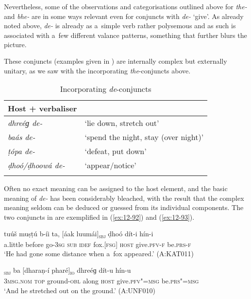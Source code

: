 Nevertheless, some of the observations and categorisations outlined above for \textit{the-} and \textit{bhe-} are in some ways relevant even for conjuncts with \textit{de-} `give'. As already noted above, \textit{de-} is already as a~simple verb rather polysemous and as such is associated with a~few different valance patterns, something that further blurs the picture.


 These conjuncts (examples given in ) are internally complex but externally unitary, as we saw with the incorporating \textit{the}-conjuncts above. 


\begin{table}[ht]
\caption{Incorporating \textit{de}-conjuncts}
\begin{tabularx}{.75\textwidth}{ l@{\hspace{45pt}} Q }
\lsptoprule
Host + verbaliser &
\\\hline
\textit{dhreéɡ de-} &
`lie down, stretch out'\\
\textit{baás de-} &
`spend the night, stay (over night)'\\
\textit{ṭópa de-} &
`defeat, put down'\\
\textit{ḍhoó/ḍhoowá de-} &
`appear/notice'\\\lspbottomrule
\end{tabularx}
\label{tab:12-7}
\end{table}


Often no exact meaning can be assigned to the host element, and the basic meaning of \textit{de-} has been considerably bleached, with the result that the complex meaning seldom can be deduced or guessed from its individual components. The two conjuncts in  are exemplified in (\ref{ex:12-92}) and (\ref{ex:12-93}).

\begin{exe}
\ex
\label{ex:12-92}
\gll tuúš muṣṭú b-íi ta, [áak luumái]\textsubscript{\textsc{sbj}} ḍhoó dít-i hín-i \\
a.little before go-\textsc{3sg} \textsc{sub} \textsc{idef} fox.[\textsc{fsg]} \textsc{host} give.\textsc{pfv-f} be.\textsc{prs-f} \\
\glt `He had gone some distance when a~fox appeared.' (A:KAT011)
\end{exe}
\begin{exe}
\ex
\label{ex:12-93}
\gll [so]\textsubscript{\textsc{sbj}} ba [dharaṇ-í pharé]\textsubscript{\textsc{io}} dhreéɡ dít-u hín-u \\
\textsc{3msg.nom} \textsc{top} ground-\textsc{obl} along \textsc{host}  give.\textsc{pfv"=msg} be.\textsc{prs"=msg} \\
\glt `And he stretched out on the ground.' (A:UNF010)
\end{exe}


